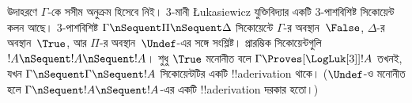 \documentclass[../../../include/open-logic-section]{subfiles}
\begin{document}
উদাহরণে $\Gamma$-কে সসীম অনুক্রম হিসেবে নিই। $3$-মানী
\L ukasiewicz যুক্তিবিদ্যার একটি
$3$-পাশবিশিষ্ট সিকোয়েন্ট কলন আছে। $3$-পাশবিশিষ্ট
$\Gamma \nSequent \Pi \nSequent \Delta$ সিকোয়েন্টে
$\Gamma$-র অবস্থান~$\False$, $\Delta$-র অবস্থান~$\True$,
আর $\Pi$-র অবস্থান~$\Undef$-এর সঙ্গে সংশ্লিষ্ট।
প্রারম্ভিক সিকোয়েন্টগুলি $!A \nSequent !A \nSequent !A$।
শুধু $\True$ মনোনীত বলে $\Gamma \Proves[\LogLuk[3]] !A$
তখনই, যখন $\Gamma \nSequent \Gamma \nSequent !A$
সিকোয়েন্টটির একটি !!a{derivation} থাকে। ($\Undef$-ও
মনোনীত হলে $\Gamma \nSequent !A \nSequent !A$-এর একটি
!!a{derivation} দরকার হতো।)
\end{document}
